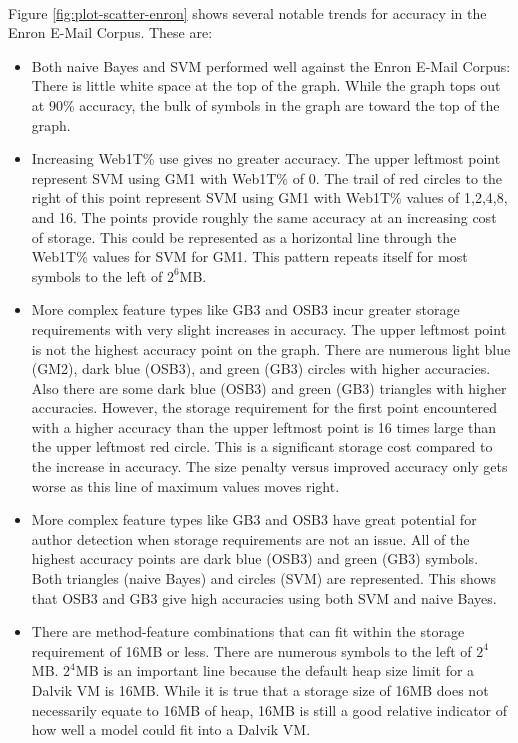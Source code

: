 \paragraph*{} Figure \ref{fig:plot-scatter-enron} shows several notable trends for accuracy in the Enron E-Mail Corpus.  These are:
	\begin{itemize}
		\item Both naive Bayes and SVM performed well against the Enron E-Mail Corpus: There is little white space at the top of the graph.  While the graph tops out at 90\% accuracy, the bulk of symbols in the graph are toward the top of the graph.  
		\item Increasing Web1T\% use gives no greater accuracy.  The upper leftmost point represent SVM using GM1 with Web1T\% of 0.  The trail of red circles to the right of this point represent SVM using GM1 with Web1T\% values of 1,2,4,8, and 16.  The points provide roughly the same accuracy at an increasing cost of storage.  This could be represented as a horizontal line through the Web1T\% values for SVM for GM1.  This pattern repeats itself for most symbols to the left of $2^6$MB.
		\item More complex feature types like GB3 and OSB3 incur greater storage requirements with very slight increases in accuracy. The upper leftmost point is not the highest accuracy point on the graph.  There are numerous light blue (GM2), dark blue (OSB3), and green (GB3) circles with higher accuracies.  Also there are some dark blue (OSB3) and green (GB3) triangles with higher accuracies.  However, the storage requirement for the first point encountered with a higher accuracy than the upper leftmost point is 16 times large than the upper leftmost red circle.  This is a significant storage cost compared to the increase in accuracy.  The size penalty versus improved accuracy only gets worse as this line of maximum values moves right.
		\item More complex feature types like GB3 and OSB3 have great potential for author detection when storage requirements are not an issue. All of the highest accuracy points are dark blue (OSB3) and green (GB3) symbols.  Both triangles (naive Bayes) and circles (SVM) are represented.  This shows that OSB3 and GB3 give high accuracies using both SVM and naive Bayes.  
		\item There are method-feature combinations that can fit within the storage requirement of 16MB or less. There are numerous symbols to the left of $2^4$MB.  $2^4$MB is an important line because the default heap size limit for a Dalvik VM is 16MB.  While it is true that a storage size of 16MB does not necessarily equate to 16MB of heap, 16MB is still a good relative indicator of how well a model could fit into a Dalvik VM.

\end{itemize}
